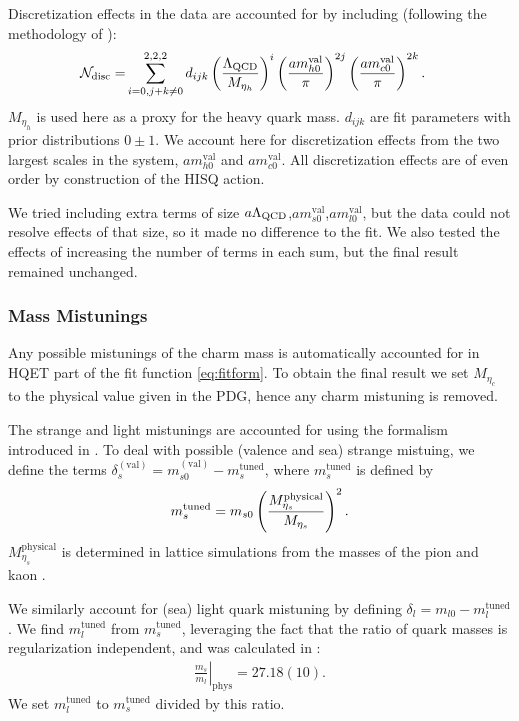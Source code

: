 Discretization effects in the data are accounted for by including (following the methodology of \cite{McNeile:2012qf}):
\begin{align}
    \label{eq:fitfun_hA1}
  \mathcal{N}_{\text{disc}} = &\sum_{i=0,j+k\neq 0}^{2,2,2} d_{ijk} \left({\Lambda_{\text{QCD}}\over M_{\eta_h} }\right)^{i} \left({ am^{\text{val}}_{h0} \over \pi }\right)^{2j} \left({ am^{\text{val}}_{c0} \over \pi }\right)^{2k}.
\end{align}
$M_{\eta_h}$ is used here as a proxy for the heavy quark mass. $d_{ijk}$ are fit parameters with prior distributions $0\pm 1$. We account here for discretization effects from the two largest scales in the system, $am^{\text{val}}_{h0}$ and $am^{\text{val}}_{c0}$. All discretization effects are of even order by construction of the HISQ action.

We tried including extra terms of size $a\Lambda_{\text{QCD}}$,$am^{\text{val}}_{s0}$,$am^{\text{val}}_{l0}$, but the data could not resolve effects of that size, so it made no difference to the fit. We also tested the effects of increasing the number of terms in each sum, but the final result remained unchanged.

\subsubsection{Mass Mistunings}

Any possible mistunings of the charm mass is automatically accounted for in HQET part of the fit function \eqref{eq:fitform}. To obtain the final result we set $M_{\eta_c}$ to the physical value given in the PDG, hence any charm mistuning is removed.

The strange and light mistunings are accounted for using the formalism introduced in \cite{Chakraborty:2014aca}. To deal with possible (valence and sea) strange mistuing, we define the terms $\delta^{(\text{val})}_s = m^{(\text{val})}_{s0}- m_s^{\text{tuned}}$, where $m_s^{\text{tuned}}$ is defined by
\begin{align}
  m_s^{\text{tuned}} = m_{s0} \left({ M^{\text{physical}}_{\eta_s} \over M_{\eta_s} }\right)^2.
\end{align}
$M_{\eta_s}^{\text{physical}}$ is determined in lattice simulations from the masses of the pion and kaon \cite{Dowdall:2013rya}.

We similarly account for (sea) light quark mistuning by defining $\delta_l = m_{l0} - m_l^{\text{tuned}}$. We find $m_l^{\text{tuned}}$ from $m_s^{\text{tuned}}$, leveraging the fact that the ratio of quark masses is regularization independent, and was calculated in \cite{Bazavov:2017lyh}:
\begin{align}
  \left.\frac{m_s}{m_l}\right\rvert_{\textrm{phys}} = 27.18(10).
\end{align}
We set $m_l^{\text{tuned}}$ to $m_s^{\text{tuned}}$ divided by this ratio.

